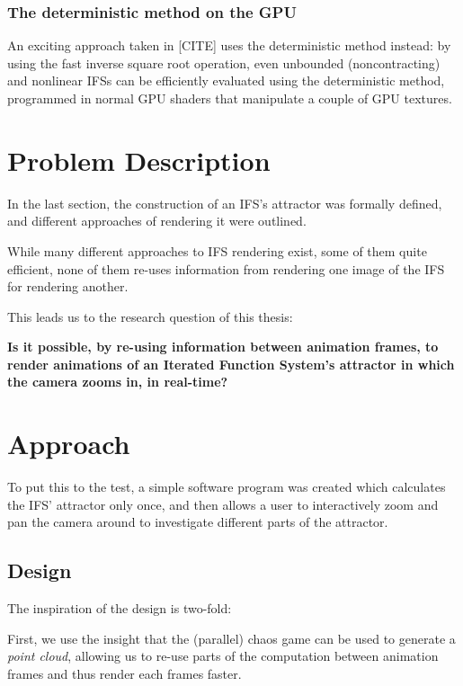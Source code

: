 \documentclass[11pt]{article}
\begin{document}
\subsubsection{The deterministic method on the GPU}
\label{sec:orgbbb02a0}
\label{subsection:deterministic_gpu}

An exciting approach taken in [CITE] uses the deterministic method instead:
by using the fast inverse square root operation, even unbounded (noncontracting) and nonlinear IFSs can be efficiently
evaluated using the deterministic method, programmed in normal GPU shaders that manipulate a couple of GPU textures.


\section{Problem Description}
\label{sec:org3184d25}

In the last section, the construction of an IFS's attractor was formally defined, 
and different approaches of rendering it were outlined.

While many different approaches to IFS rendering exist, some of them quite efficient,
none of them re-uses information from rendering one image of the IFS for rendering another.

This leads us to the research question of this thesis:

\textbf{\textbf{Is it possible, by re-using information between animation frames, to render animations of an Iterated Function System's attractor in which the camera zooms in, in real-time?}}


\section{Approach}
\label{sec:org01456ad}

To put this to the test, a simple software program was created which calculates the IFS' attractor only once,
and then allows a user to interactively zoom and pan the camera around to investigate different parts of the attractor.

\subsection{Design}
\label{sec:org1d634cb}

The inspiration of the design is two-fold:

First, we use the insight that the (parallel) chaos game can be used to generate a \emph{point cloud}, allowing us to re-use parts of the computation between animation frames
and thus render each frames faster.
\end{document}

